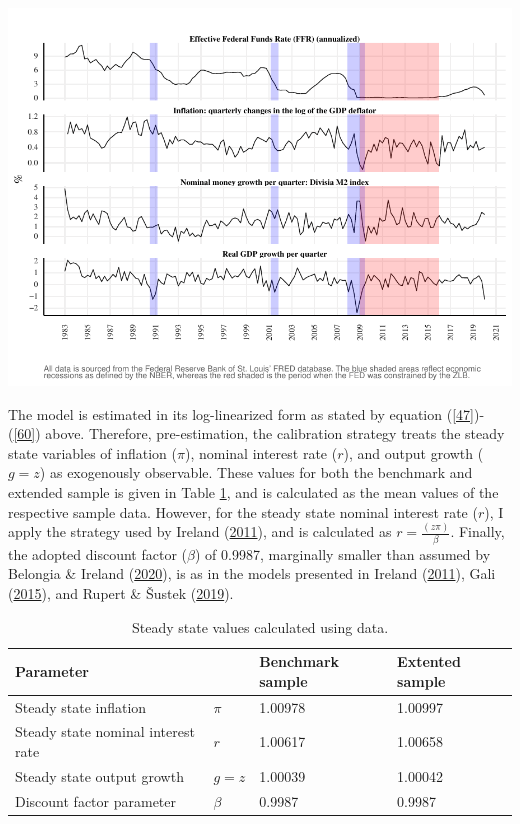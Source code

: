 \documentclass[11pt,preprint, authoryear]{elsarticle}
\let\origfigure\figure
\let\endorigfigure\endfigure
\renewenvironment{figure}[1][2] {
    \expandafter\origfigure\expandafter[H]
} {
    \endorigfigure
}
\numberwithin{equation}{section}
\numberwithin{figure}{section}
\numberwithin{table}{section}
\begin{document}
\begin{figure}[H]
\includegraphics{R_project_files/figure-latex/time series plot-1} \caption{Observed Time Series Used for Estimation. \label{timeseries}}\label{fig:time series plot}
\end{figure}

The model is estimated in its log-linearized form as stated by equation
(\ref{47})-(\ref{60}) above. Therefore, pre-estimation, the calibration
strategy treats the steady state variables of inflation (\(\pi\)),
nominal interest rate (\(r\)), and output growth (\(g=z\)) as
exogenously observable. These values for both the benchmark and extended
sample is given in Table \ref{steadystated}, and is calculated as the
mean values of the respective sample data. However, for the steady state
nominal interest rate (\(r\)), I apply the strategy used by Ireland
(\protect\hyperlink{ref-ireland2011}{2011}), and is calculated as
\(r = \frac{(z \pi)}{\beta}\). Finally, the adopted discount factor
(\(\beta\)) of 0.9987, marginally smaller than assumed by Belongia \&
Ireland (\protect\hyperlink{ref-belongia2020}{2020}), is as in the
models presented in Ireland (\protect\hyperlink{ref-ireland2011}{2011}),
Gali (\protect\hyperlink{ref-gali2015}{2015}), and Rupert \& Šustek
(\protect\hyperlink{ref-rupert2019}{2019}).

\begin{center}
\small
\begin{longtable}{llll} 
\caption{Steady state values calculated using data.}
 \label{steadystated}\\
 \toprule
 Parameter & & Benchmark sample & Extented sample\\
  \hline 
  Steady state inflation & $\pi$   &   1.00978 & 1.00997\\ 
  Steady state nominal interest rate & ${r}$    & 1.00617 & 1.00658   \\ 
  Steady state output growth & ${g=z}$  &  1.00039  & 1.00042\\ 
  Discount factor parameter & ${\beta}$    & 0.9987 & 0.9987\\ 
 \bottomrule
\end{longtable}
 \end{center}
\end{document}
